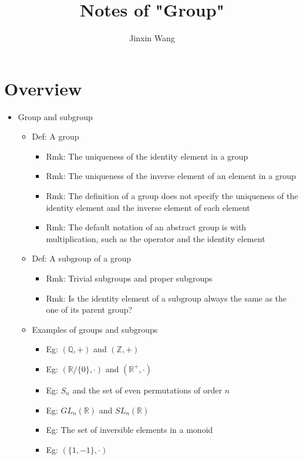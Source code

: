 \documentclass[onecolumn]{ctexart}
\title{Notes of "Group"}
\author{Jinxin Wang}
\date{}
\begin{document}
\maketitle

\section{Overview}

\begin{itemize}
  \item Group and subgroup
  \begin{itemize}
    \item Def: A group
    \begin{itemize}
      \item Rmk: The uniqueness of the identity element in a group
      \item Rmk: The uniqueness of the inverse element of an element in a group
      \item Rmk: The definition of a group does not specify the uniqueness of the identity element and the inverse element of each element
      \item Rmk: The default notation of an abstract group is with multiplication, such as the operator and the identity element
    \end{itemize}
    \item Def: A subgroup of a group
    \begin{itemize}
      \item Rmk: Trivial subgroups and proper subgroups
      \item Rmk: Is the identity element of a subgroup always the same as the one of its parent group?
    \end{itemize}
    \item Examples of groups and subgroups
    \begin{itemize}
      \item Eg: $(\mathbb{Q}, +)$ and $(\mathbb{Z}, +)$
      \item Eg: $(\mathbb{R} \slash \lbrace 0 \rbrace, \cdot)$ and $(\mathbb{R}^+, \cdot)$
      \item Eg: $S_n$ and the set of even permutations of order $n$
      \item Eg: $GL_n(\mathbb{R})$ and $SL_n(\mathbb{R})$
      \item Eg: The set of inversible elements in a monoid
      \item Eg: $(\lbrace 1, -1 \rbrace, \cdot)$
    \end{itemize}

\end{itemize}
\end{itemize}
\end{document}
